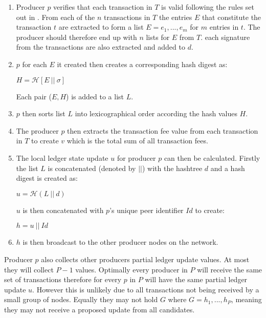 \begin{enumerate}
\item Producer $p$ verifies that each transaction in $T$ is valid following the rules set out in \cite{transactionvalidator}. From each of the $n$ transactions in $T$ the entries $E$ that constitute the transaction $t$ are extracted to form a list $E = e_1,...,e_m$ for $m$ entries in $t$. The producer should therefore end up with $n$ lists for $E$ from $T$. each signature from the transactions are also extracted and added to $d$.

\item $p$ for each $E$ it created then creates a corresponding hash digest as:
\begin{center}
$H = \mathcal{H}[E~||~\sigma]$
\end{center}

Each pair ($E,H$) is added to a list $L$.

\item $p$ then sorts list $L$ into lexicographical order according the hash values $H$.

\item The producer $p$ then extracts the transaction fee value from each transaction in $T$ to create $v$ which is the total sum of all transaction fees.

\item The local ledger state update $u$ for producer $p$ can then be calculated. Firstly the list $L$ is concatenated (denoted by $||$) with the hashtree $d$ and a hash digest is created as:

\begin{center}
$u = \mathcal{H}(L~||~d)$
\end{center}

$u$ is then concatenated with $p$'s unique peer identifier $Id$ to create:

\begin{center}
$h = u ~||~Id$
\end{center}

\item $h$ is then broadcast to the other producer nodes on the network.
\end{enumerate}



Producer $p$ also collects other producers partial ledger update values. At most they will collect $P-1$ values. Optimally every producer in $P$ will receive the same set of transactions therefore for every $p$ in $P$ will have the same partial ledger update $u$. However this is unlikely due to all transactions not being received by a small group of nodes. Equally they may not hold $G$ where $G = h_1,...,h_P$, meaning they may not receive a proposed update from all candidates.